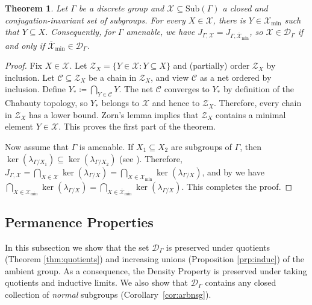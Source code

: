 \documentclass[11pt, oneside, reqno]{amsart}
\newcommand{\PRLsep}{\noindent\makebox[\linewidth]{\resizebox{0.3333\linewidth}{1pt}{$\bullet$}}\bigskip}
\newtheorem{thm}{Theorem}[section]
\theoremstyle{definition}
\theoremstyle{remark}
\numberwithin{equation}{section}
\begin{document}
\begin{thm}
\label{thm:reduceX}
    Let $\Gamma$ be a discrete group and $\mathcal{X} \subseteq \mathrm{Sub}(\Gamma)$ a closed and conjugation-invariant set of subgroups. For every $X\in \mathcal{X}$, there is $Y\in\mathcal{X}_{\mathrm{min}}$ such that $Y\subseteq X$. Consequently, for $\Gamma$ amenable, we have $J_{\Gamma,\mathcal{X}} = J_{\Gamma,\overline{\mathcal{X}}_\mathrm{min}}$, so $\mathcal{X}\in\mathcal{D}_{\Gamma}$ if and only if $\overline{\mathcal{X}}_{\mathrm{min}}\in \mathcal{D}_{\Gamma}$.
\end{thm}
\begin{proof}
     Fix $X\in \mathcal{X}$. Let $\mathcal{Z}_{X} = \{Y\in \mathcal{X} \colon Y\subseteq X\}$ and (partially) order $\mathcal{Z}_{X}$ by inclusion. Let $\mathcal{C}\subseteq \mathcal{Z}_{X}$ be a chain in $\mathcal{Z}_{X}$, and view $\mathcal{C}$ as a net ordered by inclusion. Define $Y_* \coloneq \bigcap_{Y \in \mathcal{C}} Y$. The net $\mathcal{C}$ converges to $Y_*$ by definition of the Chabauty topology, so $Y_*$ belongs to $\mathcal{X}$ and hence to $\mathcal{Z}_{X}$. Therefore, every chain in $\mathcal{Z}_{X}$ has a lower bound. Zorn's lemma implies that $\mathcal{Z}_{X}$ contains a minimal element $Y\in\mathcal{\mathcal{X}}$.
     This proves the first part of the theorem.

     Now assume that $\Gamma$ is amenable. If $X_{1}\subseteq X_{2}$ are subgroups of $\Gamma$, then $\ker(\lambda_{\Gamma/X_{1}})\subseteq \ker(\lambda_{\Gamma/X_{2}})$ (see \cite[Appendix~E~and~F]{BHV07}). Therefore, $J_{\Gamma,\mathcal{X}} =\bigcap_{X\in\mathcal{X}}\ker(\lambda_{\Gamma/X}) = \bigcap_{X\in \mathcal{X}_{\text{min}}}\ker(\lambda_{\Gamma/X})$, and by \cite[Proposition~3.3]{BK20} we have $\bigcap_{X\in \mathcal{X}_{\text{min}}}\ker(\lambda_{\Gamma/X}) = \bigcap_{X\in \overline{\mathcal{X}}_{\text{min}}}\ker(\lambda_{\Gamma/X})$. This completes the proof.
\end{proof}

\PRLsep

\subsection{Permanence Properties}\label{subset:permanence} In this subsection we show that the set $\mathcal{D}_\Gamma$ is preserved under quotients (Theorem \ref{thm:quotients}) and increasing unions (Proposition \ref{prp:induc}) of the ambient group. As a consequence, the Density Property is preserved under taking quotients and inductive limits. We also show that $\mathcal{D}_\Gamma$ contains any closed collection of \emph{normal} subgroups (Corollary~\ref{cor:arbnsg}).
\end{document}
